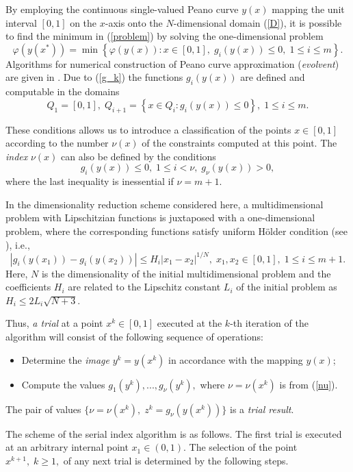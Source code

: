 \documentclass[smallextended]{svjour3}       %
\begin{document}
By employing the continuous single-valued Peano curve $y(x)$ mapping the unit interval $[0,1]$ on the $x$-axis onto the $N$-dimensional domain (\ref{D}), it is possible to find the minimum in (\ref{problem}) by solving the one-dimensional problem
\[
\varphi(y(x^\ast))=\min \left\{\varphi(y(x)): x \in [0,1], \; g_i(y(x))\leq 0, \; 1 \leq i \leq m\right\}.
\]
Algorithms for numerical construction of Peano curve approximation (\textit{evolvent}) are given in \cite{Sergeyev2013}. Due to (\ref{g_k}) the functions $g_i(y(x))$ are defined and computable in the domains 
\[
Q_1=[0,1], \; Q_{i+1}=\left\{x \in Q_i : g_i(y(x)) \leq 0 \right\}, \; 1 \leq i \leq m.
\]

These conditions allows us to introduce a classification of the points $x \in [0,1]$ according to the number $\nu (x)$ of the constraints computed at this point. The \textit{index} $\nu(x)$ can also be defined by the conditions
\begin{equation}\label{nu}
g_i(y(x)) \leq 0, \; 1 \leq i < \nu, \; g_\nu(y(x))>0,
\end{equation}
where the last inequality is inessential if $\nu=m+1$.

In the dimensionality reduction scheme considered here, a multidimensional problem with Lipschitzian functions is juxtaposed with a one-dimensional problem, where the corresponding functions satisfy uniform H{\"o}lder condition (see \cite{Sergeyev2013}), i.e.,
\[
\left|g_i(y(x_1))-g_i (y(x_2))\right| \leq H_i \left|x_1-x_2 \right|^{1/N}, \; x_1,x_2\in [0,1], \; 1\leq i \leq m+1.
\]
Here, $N$ is the dimensionality of the initial multidimensional problem and the coefficients $H_i$ are related to the Lipschitz constant $L_i$ of the initial problem as $H_i \leq 2L_i \sqrt{N+3}$.

Thus, \textit{a trial} at a point $x^k \in [0,1]$ executed at the $k$-th iteration of the algorithm will consist of the following sequence of operations:
\begin{itemize}
	\item Determine the \textit{image} $y^k=y(x^k)$ in accordance with the mapping $y(x)$;
	\item Compute the values $g_1(y^k),..., g_\nu(y^k),$ where $\nu = \nu(x^k)$ is from (\ref{nu}). 
\end{itemize}
The pair of values $ \{ \nu=\nu(x^k), \; z^k=g_\nu(y(x^k)) \} $ is a \textit{trial result}.

The scheme of the serial index algorithm is as follows. The first trial is executed at an arbitrary internal point $x_1 \in (0,1)$. The selection of the point $x^{k+1}, \; k \geq 1,$ of any next trial is determined by the following steps.
\end{document}

